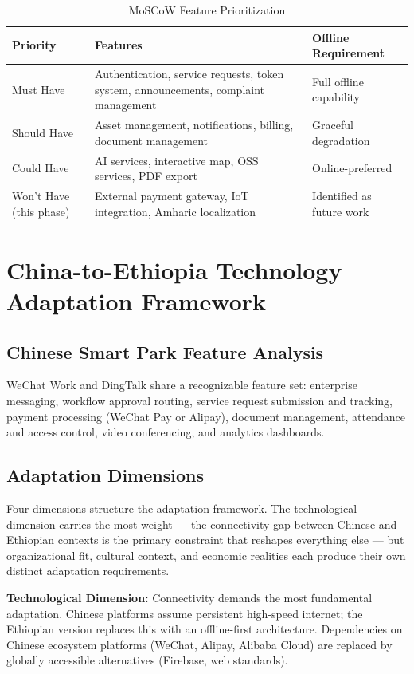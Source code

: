 \begin{table}[H]
\centering
\caption{MoSCoW Feature Prioritization}
\label{tab:moscow}
\small
\begin{tabular}{p{2.5cm}p{5cm}p{4cm}}
\toprule
\textbf{Priority} & \textbf{Features} & \textbf{Offline Requirement} \\
\midrule
Must Have & Authentication, service requests, token system, announcements, complaint management & Full offline capability \\
Should Have & Asset management, notifications, billing, document management & Graceful degradation \\
Could Have & AI services, interactive map, OSS services, PDF export & Online-preferred \\
Won't Have (this phase) & External payment gateway, IoT integration, Amharic localization & Identified as future work \\
\bottomrule
\end{tabular}
\end{table}

\section{China-to-Ethiopia Technology Adaptation Framework}

\subsection{Chinese Smart Park Feature Analysis}

WeChat Work and DingTalk share a recognizable feature set: enterprise messaging, workflow approval routing, service request submission and tracking, payment processing (WeChat Pay or Alipay), document management, attendance and access control, video conferencing, and analytics dashboards.

\subsection{Adaptation Dimensions}

Four dimensions structure the adaptation framework. The technological dimension carries the most weight --- the connectivity gap between Chinese and Ethiopian contexts is the primary constraint that reshapes everything else --- but organizational fit, cultural context, and economic realities each produce their own distinct adaptation requirements.

\textbf{Technological Dimension:} Connectivity demands the most fundamental adaptation. Chinese platforms assume persistent high-speed internet; the Ethiopian version replaces this with an offline-first architecture. Dependencies on Chinese ecosystem platforms (WeChat, Alipay, Alibaba Cloud) are replaced by globally accessible alternatives (Firebase, web standards).

